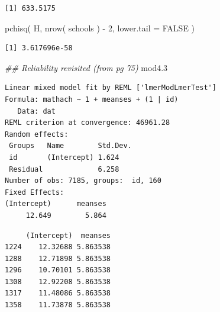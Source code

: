 \documentclass[
  letterpaper,
  DIV=11,
  numbers=noendperiod]{scrreprt}
\newenvironment{Shaded}{\begin{snugshade}}{\end{snugshade}}
\newcommand{\AttributeTok}[1]{\textcolor[rgb]{0.49,0.56,0.16}{#1}}
\newcommand{\ConstantTok}[1]{\textcolor[rgb]{0.53,0.00,0.00}{#1}}
\newcommand{\DecValTok}[1]{\textcolor[rgb]{0.25,0.63,0.44}{#1}}
\newcommand{\DocumentationTok}[1]{\textcolor[rgb]{0.73,0.13,0.13}{\textit{#1}}}
\newcommand{\FloatTok}[1]{\textcolor[rgb]{0.25,0.63,0.44}{#1}}
\newcommand{\FunctionTok}[1]{\textcolor[rgb]{0.02,0.16,0.49}{#1}}
\newcommand{\NormalTok}[1]{\textcolor[rgb]{0.00,0.44,0.13}{#1}}
\newcommand{\OtherTok}[1]{\textcolor[rgb]{0.00,0.44,0.13}{#1}}
\newcommand{\SpecialCharTok}[1]{\textcolor[rgb]{0.25,0.44,0.63}{#1}}
\begin{document}
\begin{verbatim}
[1] 633.5175
\end{verbatim}

\begin{Shaded}
\begin{Highlighting}[]
\FunctionTok{pchisq}\NormalTok{( H, }\FunctionTok{nrow}\NormalTok{( schools ) }\SpecialCharTok{{-}} \DecValTok{2}\NormalTok{, }\AttributeTok{lower.tail =} \ConstantTok{FALSE}\NormalTok{ )}
\end{Highlighting}
\end{Shaded}

\begin{verbatim}
[1] 3.617696e-58
\end{verbatim}

\begin{Shaded}
\begin{Highlighting}[]
\DocumentationTok{\#\# Reliability revisited (from pg 75)}
\NormalTok{mod4}\FloatTok{.3}
\end{Highlighting}
\end{Shaded}

\begin{verbatim}
Linear mixed model fit by REML ['lmerModLmerTest']
Formula: mathach ~ 1 + meanses + (1 | id)
   Data: dat
REML criterion at convergence: 46961.28
Random effects:
 Groups   Name        Std.Dev.
 id       (Intercept) 1.624   
 Residual             6.258   
Number of obs: 7185, groups:  id, 160
Fixed Effects:
(Intercept)      meanses  
     12.649        5.864  
\end{verbatim}

\begin{Shaded}
\end{Shaded}

\begin{verbatim}
     (Intercept)  meanses
1224    12.32688 5.863538
1288    12.71898 5.863538
1296    10.70101 5.863538
1308    12.92208 5.863538
1317    11.48086 5.863538
1358    11.73878 5.863538
\end{verbatim}

\begin{Shaded}
\end{Shaded}
\end{document}
